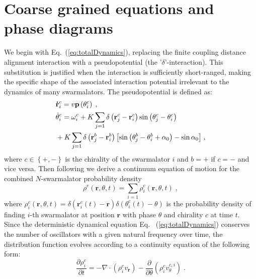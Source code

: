 \documentclass{article}
\begin{document}
\section{\label{sec:analysis}Coarse grained equations and phase diagrams}

We begin with Eq.~(\ref{eq:totalDynamics}), replacing the finite coupling distance alignment interaction with a pseudopotential (the '$\delta$'-interaction). This substitution is justified when the interaction is sufficiently short-ranged, making the specific shape of the associated interaction potential irrelevant to the dynamics of many swarmalators. The pseudopotential is defined as:
\begin{subequations}
    \begin{align}
        &\mathbf{\dot{r}}_{i}^{c}=v\mathbf{p}\left( \theta _{i}^{c} \right) \;,\\
        &\dot{\theta}_{i}^{c}=\omega _{i}^{c}+K\sum_{j=1}{\delta \left( \mathbf{r}_{j}^{c}-\mathbf{r}_{i}^{c} \right) \sin \left( \theta _{j}^{c}-\theta _{i}^{c} \right)}\notag\\
        &+K\sum_{j=1}{\delta \left( \mathbf{r}_{j}^{b}-\mathbf{r}_{i}^{b} \right) \left[ \sin \left( \theta _{j}^{b}-\theta _{i}^{b}+\alpha _0 \right) -\sin \alpha _0 \right]}\;,
    \end{align}
\end{subequations}
where $c\in\left\{+,-\right\}$ is the chirality of the swarmalator $i$ and $b=+$ if $c=-$ and vice versa.  
Then following \cite{DavidSDean_1996} we derive a continuum equation of motion for the combined $N$-swarmalator probability density
\begin{equation}
    \label{eq:globalContinuityDef}
    \rho ^c\left( \mathbf{r},\theta ,t \right) =\sum_{i=1}{\rho _{i}^{c}\left( \mathbf{r},\theta ,t \right)}\;,
\end{equation}
where $\rho _{i}^{c}\left( \mathbf{r},\theta ,t \right) =\delta \left( \mathbf{r}_{i}^{c}\left( t \right) -\mathbf{r} \right) \delta \left( \theta _{i}^{c}\left( t \right) -\theta \right)$ is the probability density of finding $i$-th swarmalator at position $\mathbf{r}$ with phase $\theta$ and chirality $c$ at time $t$.
Since the deterministic dynamical equation Eq.~ (\ref{eq:totalDynamics}) conserves the number of oscillators with a given natural frequency over time, the distribution function evolves according to a continuity equation of the following form:
\begin{equation}
    \frac{\partial \rho _{i}^{c}}{\partial t}=-\nabla \cdot \left( \rho _{i}^{c}v_{\mathbf{r}} \right) -\frac{\partial }{\partial \theta}\left( \rho _{i}^{c}v_{\theta}^{c,i} \right)\;.
    \label{eq:singleContinuity}
\end{equation}
\end{document}
